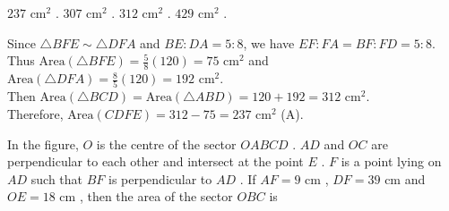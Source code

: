 \begin{minipage}{0.45\textwidth}
\begin{choices}
    \correctchoice $237\text{ cm}^2$ .
    \choice $307\text{ cm}^2$ .
    \choice $312\text{ cm}^2$ .
    \choice $429\text{ cm}^2$ .
\end{choices}
\end{minipage}
\begin{minipage}{0.52\textwidth}
\centering
{}
\end{minipage}
\begin{solution}
Since $\triangle BFE \sim \triangle DFA$ and $BE : DA = 5 : 8$, we have $EF : FA = BF : FD = 5 : 8$. \\
Thus $\text{Area}(\triangle BFE) = \frac{5}{8}(120) = 75\text{ cm}^2$ and $\text{Area}(\triangle DFA) = \frac{8}{5}(120) = 192\text{ cm}^2$. \\
Then $\text{Area}(\triangle BCD) = \text{Area}(\triangle ABD) = 120 + 192 = 312\text{ cm}^2$. \\
Therefore, $\text{Area}(CDFE) = 312 - 75 = 237\text{ cm}^2$ (A).
\end{solution}

\question In the figure, $O$ is the centre of the sector $OABCD$ . $AD$ and $OC$ are perpendicular to each other and intersect at the point $E$ . $F$ is a point lying on $AD$ such that $BF$ is perpendicular to $AD$ . If $AF = 9\text{ cm}$ , $DF = 39\text{ cm}$ and $OE = 18\text{ cm}$ , then the area of the sector $OBC$ is

